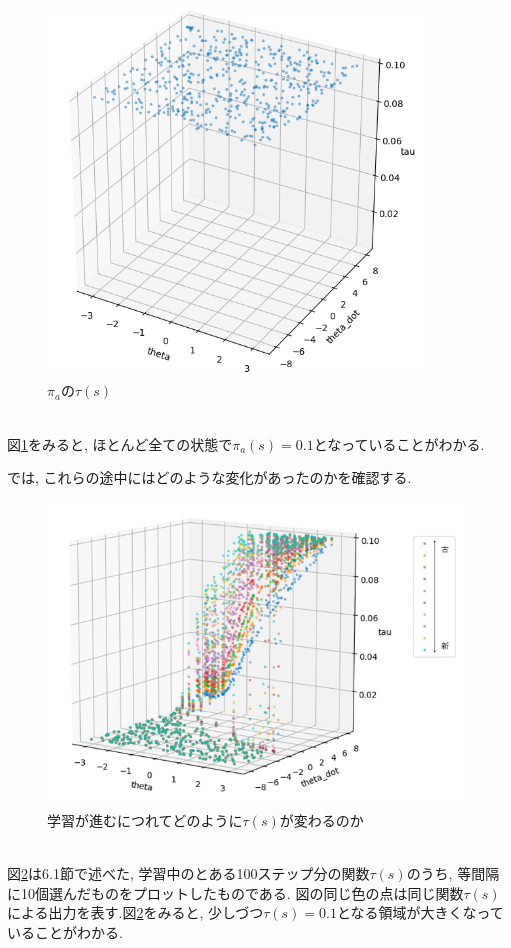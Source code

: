 \documentclass{jsarticle}
\begin{document}
\begin{figure}[h]
	\centering
 	\includegraphics[width=10cm]{tau_dependency_of_last_policy.png}
 	\caption{$\pi_a$の$\tau(s)$} \label{last_policy_tau}
\end{figure}\\
図\ref{last_policy_tau}をみると, ほとんど全ての状態で$\pi_a(s)=0.1$となっていることがわかる.\par
\newpage
では, これらの途中にはどのような変化があったのかを確認する. 
\begin{figure}[h]
	\centering
 	\includegraphics[width=12cm]{tau_dependency_of_state.png}
 	\caption{学習が進むにつれてどのように$\tau(s)$が変わるのか} \label{on_the_way}
\end{figure}\\
図\ref{on_the_way}は6.1節で述べた, 学習中のとある100ステップ分の関数$\tau(s)$のうち, 等間隔に10個選んだものをプロットしたものである. 図の同じ色の点は同じ関数$\tau(s)$による出力を表す.図\ref{on_the_way}をみると, 少しづつ$\tau(s)=0.1$となる領域が大きくなっていることがわかる. \par
\end{document}
